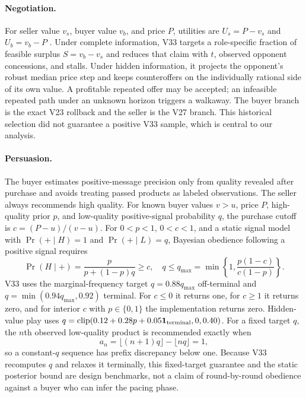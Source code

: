 \paragraph{Negotiation.}
For seller value $v_s$, buyer value $v_b$, and price $P$, utilities are
$U_s=P-v_s$ and $U_b=v_b-P$ \citep{nash1950bargaining}. Under complete
information, V33 targets a
role-specific fraction of feasible surplus $S=v_b-v_s$ and reduces that claim
with $t$, observed opponent concessions, and stalls. Under hidden information,
it projects the opponent's robust median price step and keeps counteroffers on
the individually rational side of its own value. A profitable repeated offer
may be accepted; an infeasible repeated path under an unknown horizon triggers
a walkaway. The buyer branch is the exact V23 rollback and the seller is the
V27 branch. This historical selection did not guarantee a positive V33 sample,
which is central to our analysis.

\paragraph{Persuasion.}
The buyer estimates positive-message precision only from quality revealed after
purchase and avoids treating passed products as labeled observations. The
seller always recommends high quality. For known buyer values $v>u$, price $P$,
high-quality prior $p$, and low-quality positive-signal probability $q$, the
purchase cutoff is $c=(P-u)/(v-u)$. For $0<p<1$, $0<c<1$, and a static
signal model with $\Pr(+\mid H)=1$ and $\Pr(+\mid L)=q$, Bayesian obedience
following a positive signal \citep{kamenica2011bayesian} requires
\begin{equation}
 \Pr(H\mid +)=\frac{p}{p+(1-p)q}\ge c,
 \quad q\le q_{\max}=\min\!\left\{1,\frac{p(1-c)}{c(1-p)}\right\}.
 \label{eq:obedience}
\end{equation}
V33 uses the marginal-frequency target $q=0.88q_{\max}$ off-terminal and
$q=\min(0.94q_{\max},0.92)$ terminal. For $c\leq0$ it returns one, for
$c\geq1$ it returns zero, and for interior $c$ with $p\in\{0,1\}$ the
implementation returns zero. Hidden-value play uses
$q=\operatorname{clip}(0.12+0.28p+0.05\mathbf{1}_{\rm terminal},0,0.40)$.
For a fixed target $q$, the $n$th observed low-quality product is recommended
exactly when
\begin{equation}
 a_n=\lfloor(n+1)q\rfloor-\lfloor nq\rfloor=1,
 \label{eq:pacing}
\end{equation}
so a constant-$q$ sequence has prefix discrepancy below one. Because V33
recomputes $q$ and relaxes it terminally, this fixed-target guarantee and the
static posterior bound are design benchmarks, not a claim of round-by-round
obedience against a buyer who can infer the pacing phase.

